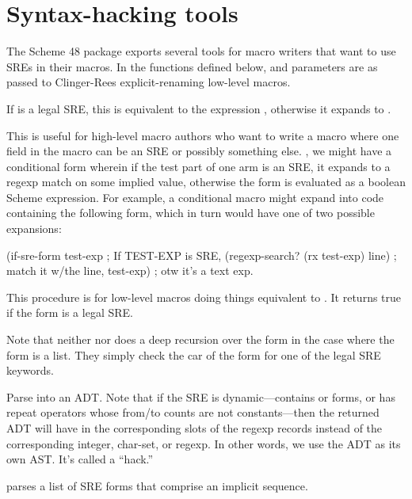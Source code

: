 \section{Syntax-hacking tools}

The Scheme 48 package  exports several tools for macro
writers that want to use SREs in their macros. In the functions defined
below,  and  parameters are as passed to Clinger-Rees
explicit-renaming low-level macros.

\begin{desc}
If  is a legal SRE, this is equivalent to the expression
, otherwise it expands to .

This is useful for high-level macro authors who want to write a macro
where one field in the macro can be an SRE or possibly something
else. \Eg, we might have a conditional form wherein if the
test part of one arm is an SRE, it expands to a regexp match
on some implied value, otherwise the form is evaluated as a boolean 
Scheme expression.
For example, a conditional macro might expand into code containing
the following form, which in turn would have one of two possible
expansions:
\begin{centercode}
(if-sre-form test-exp                 ; If TEST-EXP is SRE,
  (regexp-search? (rx test-exp) line) ; match it w/the line,
  test-exp)                           ; otw it's a text exp.\end{centercode}%
\end{desc}


\begin{desc}
This procedure is for low-level macros doing things equivalent to
. It returns true if the form is a legal SRE.

Note that neither  nor  does a deep recursion
over the form in the case where the form is a list. 
They simply check the car of the form for one of the legal SRE keywords.
\end{desc}

\begin{desc}
Parse  into an ADT. Note that if the SRE is dynamic---contains
 or  forms, 
or has repeat operators whose from/to counts are not constants---then
the returned ADT will have  in the corresponding 
slots of the regexp records instead of the corresponding 
integer, char-set, or regexp. 
In other words, we use the ADT as its own AST. It's called a ``hack.''

 parses a list of SRE forms that comprise an implicit sequence.
\end{desc}

